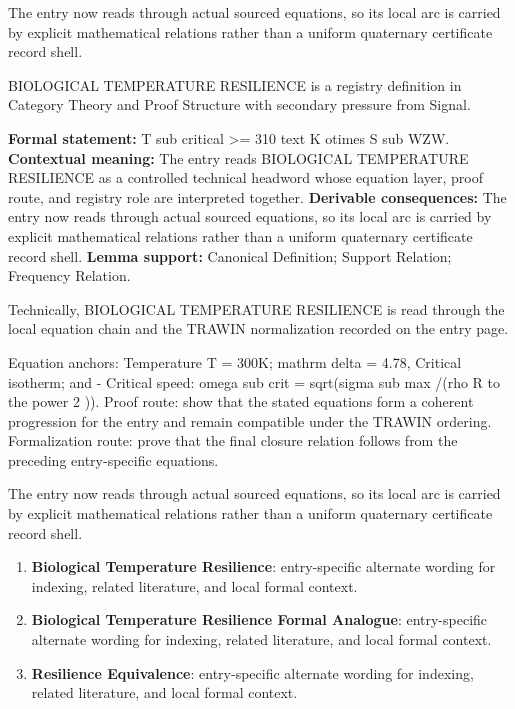 The entry now reads through actual sourced equations, so its local arc is carried by explicit mathematical relations rather than a uniform quaternary certificate record shell.
\clearpage


\begingroup\small
{}
BIOLOGICAL TEMPERATURE RESILIENCE is a registry definition in Category Theory and Proof Structure with secondary pressure from Signal.

\begingroup\footnotesize\setlength{\emergencystretch}{3em}\sloppy
\textbf{Formal statement:} T sub critical >= 310 text K otimes S sub WZW. \textbf{Contextual meaning:} The entry reads BIOLOGICAL TEMPERATURE RESILIENCE as a controlled technical headword whose equation layer, proof route, and registry role are interpreted together. \textbf{Derivable consequences:} The entry now reads through actual sourced equations, so its local arc is carried by explicit mathematical relations rather than a uniform quaternary certificate record shell. \textbf{Lemma support:} Canonical Definition; Support Relation; Frequency Relation.\par
\endgroup

Technically, BIOLOGICAL TEMPERATURE RESILIENCE is read through the local equation chain and the TRAWIN normalization recorded on the entry page.

Equation anchors: Temperature T = 300K; mathrm delta = 4.78, Critical isotherm; and - Critical speed: omega sub crit = sqrt(sigma sub max /(rho R to the power 2 )). Proof route: show that the stated equations form a coherent progression for the entry and remain compatible under the TRAWIN ordering. Formalization route: prove that the final closure relation follows from the preceding entry-specific equations.

The entry now reads through actual sourced equations, so its local arc is carried by explicit mathematical relations rather than a uniform quaternary certificate record shell.
\endgroup

\begin{enumerate}[leftmargin=1.6em,itemsep=6pt,topsep=4pt]
\item \textbf{Biological Temperature Resilience}: entry-specific alternate wording for indexing, related literature, and local formal context.
\item \textbf{Biological Temperature Resilience Formal Analogue}: entry-specific alternate wording for indexing, related literature, and local formal context.
\item \textbf{Resilience Equivalence}: entry-specific alternate wording for indexing, related literature, and local formal context.
\end{enumerate}

